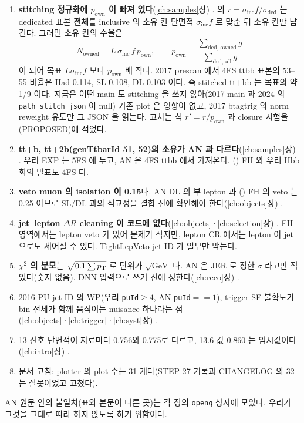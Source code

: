 \begin{enumerate}[leftmargin=*]
\item \textbf{stitching 정규화에 $p_{\text{own}}$ 이 빠져 있다}(\ref{ch:samples}장) \tagopen.
 의 $r=\sigma_{\text{inc}} f/\sigma_{\text{ded}}$ 는 dedicated 표본 \textbf{전체}를 inclusive 의 소유 칸 단면적
$\sigma_{\text{inc}}f$ 로 맞춘 뒤 소유 칸만 남긴다. 그러면 소유 칸의 수율은
\begin{equation}
N_{\text{owned}} = L\,\sigma_{\text{inc}}\,f\,p_{\text{own}},\qquad p_{\text{own}}=\frac{\sum_{\text{ded, owned}} g}{\sum_{\text{ded, all}} g}
\label{eq:status-pown}
\end{equation}
이 되어 목표 $L\sigma_{\text{inc}}f$ 보다 $p_{\text{own}}$ 배 작다. 2017 prescan 에서 4FS ttbb 표본의 53–55 비율은 Had 0.114, SL 0.108,
DL 0.103 이다. 즉 stitched tt+bb 는 목표의 약 1/9 이다. 지금은 어떤 main 도 stitching 을
쓰지 않아(2017 main 과 2024 의 \texttt{path\_stitch\_json} 이 null) 기존 plot 은 영향이 없고, 2017 btagtrig 의 norm reweight 유도만
그 JSON 을 읽는다. 고치는 식 $r'=r/p_{\text{own}}$ 과 closure 시험을 (PROPOSED)에 적었다.
\item \textbf{tt+b, tt+2b(genTtbarId 51, 52)의 소유가 AN 과 다르다}(\ref{ch:samples}장) \tagopen. 우리 EXP 는 5FS 에 두고, AN 은 4FS
ttbb 에서 가져온다. \ttH(\bbbar) FH 와 우리 Hbb 회의 발표도 4FS 다.
\item \textbf{veto muon 의 isolation 이 0.15}다. AN DL 의 부 lepton 과 \ttH(\bbbar) FH 의 veto 는 0.25 이므로
SL/DL 과의 직교성을 결합 전에 확인해야 한다(\ref{ch:objects}장) \tagopen.
\item \textbf{jet–lepton $\Delta R$ cleaning 이 코드에 없다}(\ref{ch:objects}·\ref{ch:selection}장) \tagopen. FH 영역에서는 lepton veto 가 있어 문제가
작지만, lepton CR 에서는 lepton 이 jet 으로도 세어질 수 있다. TightLepVeto jet ID 가 일부만 막는다.
\item \textbf{$\chi^2$ 의 분모}는 $\sqrt{0.1\sum p_{\mathrm{T}}}$ 로 단위가 $\sqrt{\mathrm{GeV}}$ 다. AN 은 JER 로 정한 $\sigma$ 라고만
적었다(숫자 없음). DNN 입력으로 쓰기 전에 정한다(\ref{ch:reco}장) \tagopen.
\item 2016 PU jet ID 의 WP(우리 \texttt{puId}$\geq4$, AN \texttt{puId}$==1$), trigger SF 불확도가 bin 전체가 함께 움직이는
nuisance 하나라는 점(\ref{ch:objects}·\ref{ch:trigger}·\ref{ch:syst}장) \tagopen.
\item 13\TeV{} 신호 단면적이 자료마다 0.756\fb{}와 0.775\fb{}로 다르고,
13.6\TeV{} 값 0.860\fb{} 는 임시값이다(\ref{ch:intro}장) \tagopen.
\item 문서 고침: plotter  의 plot 수는 31 개다(STEP 27 기록과 CHANGELOG 의 32 는 잘못이었고 고쳤다).
\end{enumerate}

AN 원문 안의 불일치(표와 본문이 다른 곳)는 각 장의 \texttt{openq} 상자에 모았다. 우리가 그것을 그대로 따라 하지 않도록 하기 위함이다.
